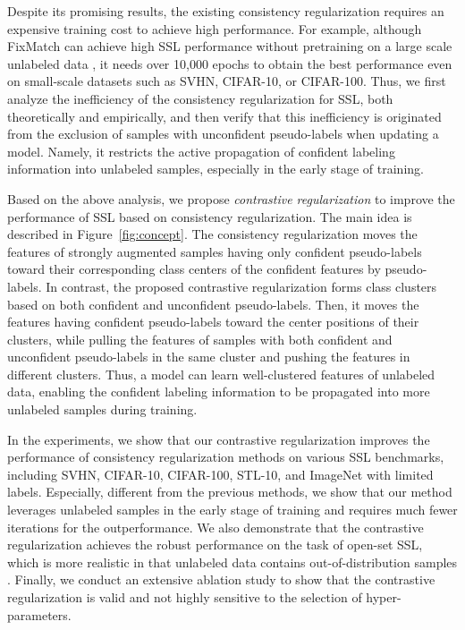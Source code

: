 \documentclass[letterpaper]{article} \usepackage{aaai22}  \usepackage{times}  \usepackage{helvet}  \usepackage{courier}  \usepackage[hyphens]{url}  \usepackage{graphicx} \urlstyle{rm} \def\UrlFont{\rm}  \usepackage{natbib}  \usepackage{caption} \DeclareCaptionStyle{ruled}{labelfont=normalfont,labelsep=colon,strut=off} \frenchspacing  \setlength{\pdfpagewidth}{8.5in}  \setlength{\pdfpageheight}{11in}  \usepackage{algorithm}
\begin{document}
Despite its promising results, the existing consistency regularization requires an expensive training cost to achieve high performance.
For example, although FixMatch \cite{sohn2020fixmatch} can achieve high SSL performance without pretraining on a large scale unlabeled data \cite{chen2020big}, it needs over 10,000 epochs to obtain the best performance even on small-scale datasets such as SVHN, CIFAR-10, or CIFAR-100.
Thus, we first analyze the inefficiency of the consistency regularization for SSL, both theoretically and empirically, and then verify that this inefficiency is originated from the exclusion of samples with unconfident pseudo-labels when updating a model.
Namely, it restricts the active propagation of confident labeling information into unlabeled samples, especially in the early stage of training.

Based on the above analysis, we propose \textit{contrastive regularization} to improve the performance of SSL based on consistency regularization.
The main idea is described in Figure~\ref{fig:concept}.
The consistency regularization moves the features of strongly augmented samples having only confident pseudo-labels toward their corresponding class centers of the confident features by pseudo-labels. 
In contrast, the proposed contrastive regularization forms class clusters based on both confident and unconfident pseudo-labels.
Then, it moves the features having confident pseudo-labels toward the center positions of their clusters, while pulling the features of samples with both confident and unconfident pseudo-labels in the same cluster and pushing the features in different clusters.
Thus, a model can learn well-clustered features of unlabeled data, enabling the confident labeling information to be propagated into more unlabeled samples during training.

In the experiments, we show that our contrastive regularization improves the performance of consistency regularization methods on various SSL benchmarks, including SVHN, CIFAR-10, CIFAR-100, STL-10, and ImageNet with limited labels.
Especially, different from the previous methods, we show that our method leverages unlabeled samples in the early stage of training and requires much fewer iterations for the outperformance.
We also demonstrate that the contrastive regularization achieves the robust performance on the task of open-set SSL, which is more realistic in that unlabeled data contains out-of-distribution samples \cite{oliver2018realistic,yu2020multi}.
Finally, we conduct an extensive ablation study to show that the contrastive regularization is valid and not highly sensitive to the selection of hyper-parameters.
\end{document}
